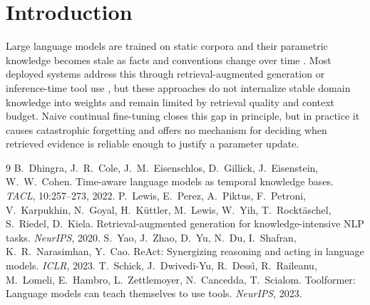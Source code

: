 \documentclass[10pt,twocolumn]{article}
\begin{document}
\section*{Introduction}

Large language models are trained on static corpora and their parametric knowledge becomes stale as facts and conventions change over time \cite{dhingra2022time}. Most deployed systems address this through retrieval-augmented generation \cite{lewis2020retrieval} or inference-time tool use \cite{yao2023react,schick2023toolformer}, but these approaches do not internalize stable domain knowledge into weights and remain limited by retrieval quality and context budget. Naive continual fine-tuning closes this gap in principle, but in practice it causes catastrophic forgetting and offers no mechanism for deciding when retrieved evidence is reliable enough to justify a parameter update.

\footnotesize{
\begin{thebibliography}{9}
 B.~Dhingra, J.~R.~Cole, J.~M.~Eisenschlos, D.~Gillick, J.~Eisenstein, W.~W.~Cohen. Time-aware language models as temporal knowledge bases. \textit{TACL}, 10:257--273, 2022.
 P.~Lewis, E.~Perez, A.~Piktus, F.~Petroni, V.~Karpukhin, N.~Goyal, H.~K\"uttler, M.~Lewis, W.~Yih, T.~Rockt\"aschel, S.~Riedel, D.~Kiela. Retrieval-augmented generation for knowledge-intensive NLP tasks. \textit{NeurIPS}, 2020.
 S.~Yao, J.~Zhao, D.~Yu, N.~Du, I.~Shafran, K.~R.~Narasimhan, Y.~Cao. ReAct: Synergizing reasoning and acting in language models. \textit{ICLR}, 2023.
 T.~Schick, J.~Dwivedi-Yu, R.~Dess\`i, R.~Raileanu, M.~Lomeli, E.~Hambro, L.~Zettlemoyer, N.~Cancedda, T.~Scialom. Toolformer: Language models can teach themselves to use tools. \textit{NeurIPS}, 2023.
\end{thebibliography}
}
\end{document}
